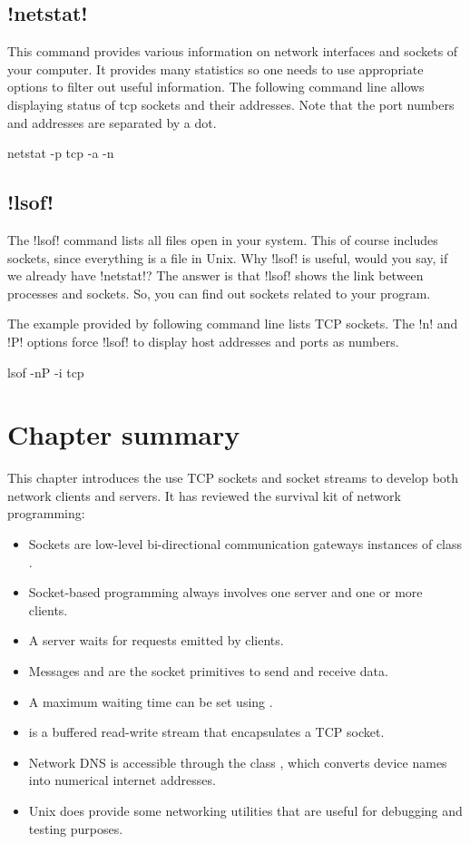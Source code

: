 \documentclass[a4paper,10pt,twoside]{book}
\begin{document}
\subsection{\ct!netstat!}
This command provides various information on network interfaces and sockets of your computer.
It provides many statistics so one needs to use appropriate options to filter out useful information.
The following command line allows displaying status of tcp sockets and their addresses.
Note that the port numbers and addresses are separated by a dot.
\begin{code}{}
netstat -p tcp -a -n
\end{code}
 
\subsection{\ct!lsof!}
The \ct!lsof! command lists all files open in your system.
This of course includes sockets, since everything is a file in Unix.
Why \ct!lsof! is useful, would you say, if we already have \ct!netstat!?
The answer is that \ct!lsof! shows the link between processes and sockets.
So, you can find out sockets related to your program.

The example provided by following command line lists TCP sockets.
The \ct!n! and \ct!P! options force \ct!lsof! to display host addresses and ports as numbers. 
\begin{code}{}
lsof -nP -i tcp
\end{code}


\section{Chapter summary}
This chapter introduces the use TCP sockets and socket streams to develop both network clients and servers. It has reviewed the survival kit of network programming:

\begin{itemize}
\item Sockets are low-level bi-directional communication gateways instances of class .
\item Socket-based programming always involves one server and one or more clients.
\item A server waits for requests emitted by clients.
\item Messages  and  are the socket primitives to send and receive data.
\item A maximum waiting time can be set using .
\item {} is a buffered read-write stream that encapsulates a TCP socket.
\item Network DNS is accessible through the class , which converts device names into numerical internet addresses.
\item Unix does provide some networking utilities that are useful for debugging and testing purposes.
\end{itemize}
\end{document}

